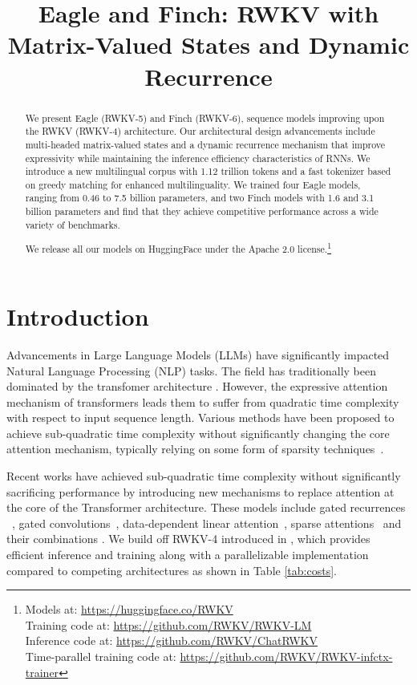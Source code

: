 \title{Eagle and Finch: RWKV with Matrix-Valued States and Dynamic Recurrence}

\begin{abstract}
We present Eagle (RWKV-5) and Finch (RWKV-6), sequence models improving upon the RWKV (RWKV-4) \citep{peng2023rwkv} architecture. Our architectural design advancements include multi-headed matrix-valued states and a dynamic recurrence mechanism that improve expressivity while maintaining the inference efficiency characteristics of RNNs. We introduce a new multilingual corpus with 1.12 trillion tokens and a fast tokenizer based on greedy matching for enhanced multilinguality. We trained four Eagle models, ranging from 0.46 to 7.5 billion parameters, and two Finch models with 1.6 and 3.1 billion parameters and find that they achieve competitive performance across a wide variety of benchmarks.

We release all our models on HuggingFace under the Apache 2.0 license.\footnote{Models at: \url{https://huggingface.co/RWKV}\\Training code at: \url{https://github.com/RWKV/RWKV-LM}\\
Inference code at: \url{https://github.com/RWKV/ChatRWKV}\\
Time-parallel training code at: \url{https://github.com/RWKV/RWKV-infctx-trainer}}
\end{abstract}

\section{Introduction} \label{sec:introduction}

Advancements in Large Language Models (LLMs) have significantly impacted Natural Language Processing (NLP) tasks. The field has traditionally been dominated by the transfomer architecture \citep{vaswani2023attention}. However, the expressive attention mechanism of transformers leads them to suffer from quadratic time complexity with respect to input sequence length. Various methods have been proposed to achieve sub-quadratic time complexity without significantly changing the core attention mechanism, typically relying on some form of sparsity techniques~\citep{child2019generatingsparse, beltagy2020longformer, zaheer2020bigbird}.

Recent works have achieved sub-quadratic time complexity without significantly sacrificing performance by introducing new mechanisms to replace attention at the core of the Transformer architecture. These models include gated recurrences ~\citep{fu2023hungry,gu2023mamba,gu2021s4,sun2023retentive,katsch2023gateloop, qin2023hierarchically, smith2023s5}, gated convolutions~\citep{poli2023hyena, peng2023rwkv}, data-dependent linear attention~\citep{yang2023gated, linearTrans2020inputDepend}, sparse attentions~\citep{tay2020sparse,child2019sparsetransformer,zaheer2020bigbird,blockwindow2019sparsetransformer} and their combinations \citep{de2024griffin, qin2024transnormerllm, qin2022deviltransnormer}. We build off RWKV-4 introduced in \cite{peng2023rwkv}, which provides efficient inference and training along with a parallelizable implementation compared to competing architectures as shown in Table \ref{tab:costs}.

